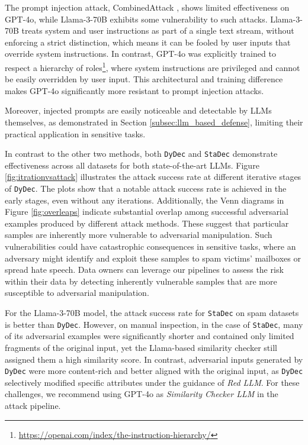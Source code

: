 \documentclass[11pt]{article}
\newcommand \dydec[0]{\texttt{DyDec}}
\newcommand \stadec[0]{\texttt{StaDec}}
\newcommand \redLLM[0]{\textsl{Red LLM}}
\newcommand \similarityCheckerLLM[0]{\textsl{Similarity Checker LLM}}
\begin{document}
The prompt injection attack, CombinedAttack \cite{299563}, shows limited effectiveness on GPT-4o, while Llama-3-70B exhibits some vulnerability to such attacks. Llama-3-70B treats system and user instructions as part of a single text stream, without enforcing a strict distinction, which means it can be fooled by user inputs that override system instructions. In contrast, GPT-4o was explicitly trained to respect a hierarchy of roles\footnote{\url{https://openai.com/index/the-instruction-hierarchy/}}, where system instructions are privileged and cannot be easily overridden by user input. This architectural and training difference makes GPT-4o significantly more resistant to prompt injection attacks. 

 Moreover, injected prompts are easily noticeable and detectable by LLMs themselves, as demonstrated in Section \ref{subsec:llm_based_defense}, limiting their practical application in sensitive tasks.

In contrast to the other two methods, both \dydec{} and \stadec{} demonstrate effectiveness across all datasets for both state-of-the-art LLMs. Figure \ref{fig:itrationvsattack} illustrates the attack success rate at different iterative stages of \dydec{}. The plots show that a notable attack success rate is achieved in the early stages, even without any iterations. Additionally, the Venn diagrams in Figure \ref{fig:overleaps} indicate substantial overlap among successful adversarial examples produced by different attack methods. These suggest that particular samples are inherently more vulnerable to adversarial manipulation. Such vulnerabilities could have catastrophic consequences in sensitive tasks, where an adversary might identify and exploit these samples to spam victims’ mailboxes or spread hate speech. Data owners can leverage our pipelines to assess the risk within their data by detecting inherently vulnerable samples that are more susceptible to adversarial manipulation.


For the Llama-3-70B model, the attack success rate for \stadec{} on spam datasets is better than \dydec{}. However, on manual inspection, in the case of \stadec{}, many of its adversarial examples were significantly shorter and contained only limited fragments of the original input, yet the Llama-based similarity checker still assigned them a high similarity score. In contrast, adversarial inputs generated by \dydec{} were more content-rich and better aligned with the original input, as \dydec{} selectively modified specific attributes under the guidance of \redLLM{}. For these challenges, we recommend using GPT-4o as \similarityCheckerLLM{} in the attack pipeline.
\end{document}
